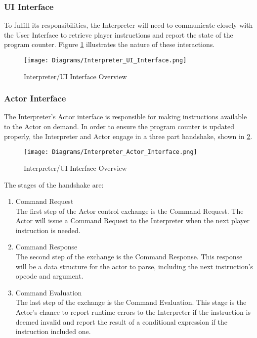 \subsubsection{UI Interface}
To fulfill its responsibilities, the Interpreter will need to communicate closely with the User 
Interface to retrieve player instructions and report the state of the program counter. 
Figure \ref{fig:interpreter_UI_interface} illustrates the nature of these interactions.

\begin{figure}[!htb]
	\caption{Interpreter/UI Interface Overview}
	\label{fig:interpreter_UI_interface}
	\centering
	\texttt{[image: Diagrams/Interpreter\_UI\_Interface.png]}
\end{figure}

\subsubsection{Actor Interface}
The Interpreter's Actor interface is responsible for making instructions available to the 
Actor on demand. In order to ensure the program counter is updated properly, the 
Interpreter and Actor engage in a three part handshake, shown in 
\ref{fig:interpreter_Actor_interface}.\\

\begin{figure}[!hb]
    \caption{Interpreter/UI Interface Overview}
    \label{fig:interpreter_Actor_interface}
    \centering
    \texttt{[image: Diagrams/Interpreter\_Actor\_Interface.png]}
\end{figure}

\newpage
The stages of the handshake are:
\begin{enumerate}
	\item Command Request\\
	The first step of the Actor control exchange is the Command Request. The Actor 
	will issue a Command Request to the Interpreter when the next player instruction is needed.
	\item Command Response\\
	The second step of the exchange is the Command Response. This response will be a 
	data structure for the actor to parse, including the next instruction's opcode and argument.
	\item Command Evaluation\\
	The last step of the exchange is the Command Evaluation. This stage is the Actor's chance 
	to report runtime errors to the Interpreter if the instruction is deemed invalid and report 
	the result of a conditional expression if the instruction included one. 
\end{enumerate}